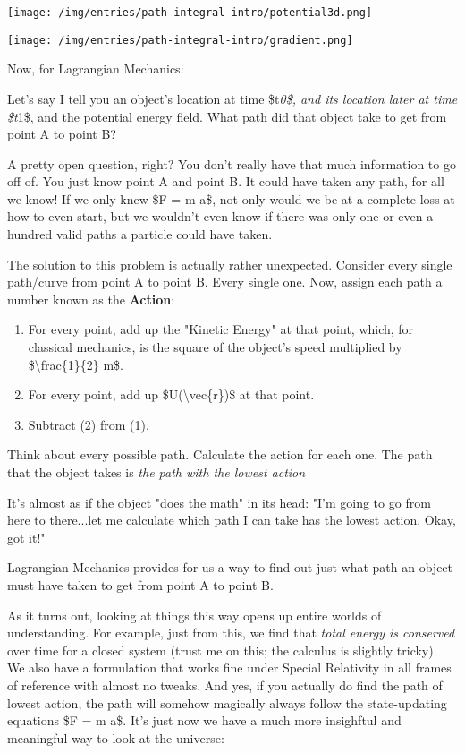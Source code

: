 \documentclass[]{article}
\begin{document}
\texttt{[image: /img/entries/path-integral-intro/potential3d.png]}

\texttt{[image: /img/entries/path-integral-intro/gradient.png]}

Now, for Lagrangian Mechanics:

Let's say I tell you an object's location at time \$t\emph{0\$, and its location
later at time \$t}1\$, and the potential energy field. What path did that object
take to get from point A to point B?

A pretty open question, right? You don't really have that much information to go
off of. You just know point A and point B. It could have taken any path, for all
we know! If we only knew \$F = m a\$, not only would we be at a complete loss at
how to even start, but we wouldn't even know if there was only one or even a
hundred valid paths a particle could have taken.

The solution to this problem is actually rather unexpected. Consider every
single path/curve from point A to point B. Every single one. Now, assign each
path a number known as the \textbf{Action}:

\begin{enumerate}
\tightlist
\item
  For every point, add up the "Kinetic Energy" at that point, which, for
  classical mechanics, is the square of the object's speed multiplied by
  \$\textbackslash{}frac\{1\}\{2\} m\$.
\item
  For every point, add up \$U(\textbackslash{}vec\{r\})\$ at that point.
\item
  Subtract (2) from (1).
\end{enumerate}

Think about every possible path. Calculate the action for each one. The path
that the object takes is \emph{the path with the lowest action}

It's almost as if the object "does the math" in its head: "I'm going to go from
here to there...let me calculate which path I can take has the lowest action.
Okay, got it!"

Lagrangian Mechanics provides for us a way to find out just what path an object
must have taken to get from point A to point B.

As it turns out, looking at things this way opens up entire worlds of
understanding. For example, just from this, we find that \emph{total energy is
conserved} over time for a closed system (trust me on this; the calculus is
slightly tricky). We also have a formulation that works fine under Special
Relativity in all frames of reference with almost no tweaks. And yes, if you
actually do find the path of lowest action, the path will somehow magically
always follow the state-updating equations \$F = m a\$. It's just now we have a
much more insighftul and meaningful way to look at the universe:
\end{document}
